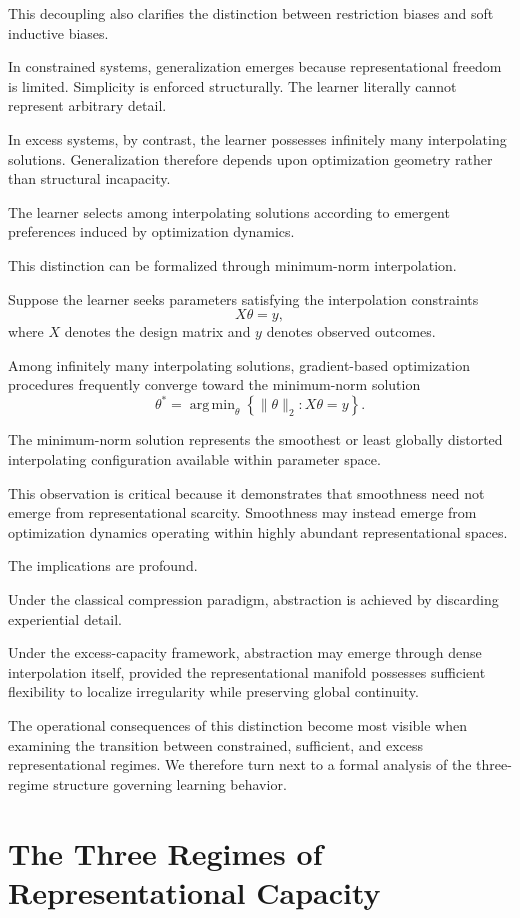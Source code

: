 \documentclass[12pt,a4paper]{article}
\DeclareMathOperator*{\argmin}{arg\,min}
\begin{document}
This decoupling also clarifies the distinction between restriction biases and soft inductive biases.

In constrained systems, generalization emerges because representational freedom is limited. Simplicity is enforced structurally. The learner literally cannot represent arbitrary detail.

In excess systems, by contrast, the learner possesses infinitely many interpolating solutions. Generalization therefore depends upon optimization geometry rather than structural incapacity.

The learner selects among interpolating solutions according to emergent preferences induced by optimization dynamics.

This distinction can be formalized through minimum-norm interpolation.

Suppose the learner seeks parameters satisfying the interpolation constraints
\[
X\theta = y,
\]
where \(X\) denotes the design matrix and \(y\) denotes observed outcomes.

Among infinitely many interpolating solutions, gradient-based optimization procedures frequently converge toward the minimum-norm solution
\[
\theta^\ast
=
\argmin_{\theta}
\left\{
\|\theta\|_2
:
X\theta = y
\right\}.
\]

The minimum-norm solution represents the smoothest or least globally distorted interpolating configuration available within parameter space.

This observation is critical because it demonstrates that smoothness need not emerge from representational scarcity. Smoothness may instead emerge from optimization dynamics operating within highly abundant representational spaces.

The implications are profound.

Under the classical compression paradigm, abstraction is achieved by discarding experiential detail.

Under the excess-capacity framework, abstraction may emerge through dense interpolation itself, provided the representational manifold possesses sufficient flexibility to localize irregularity while preserving global continuity.

The operational consequences of this distinction become most visible when examining the transition between constrained, sufficient, and excess representational regimes. We therefore turn next to a formal analysis of the three-regime structure governing learning behavior.

\section{The Three Regimes of Representational Capacity}
\label{sec:three-regimes}
\end{document}
